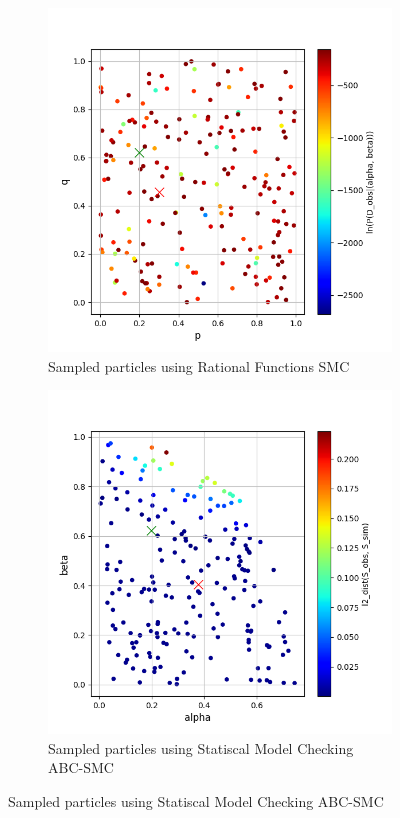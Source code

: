 \begin{figure}[H]
    \centering
    \begin{subfigure}{0.48\textwidth}
        \centering
        \includegraphics[width=\linewidth]{figures/zeroconf10_rf.png}
        \caption{Sampled particles using Rational Functions SMC}
    \end{subfigure}
    \hfill
    \begin{subfigure}{0.48\textwidth}
        \centering
        \includegraphics[width=\linewidth]{figures/zeroconf10_sim.png}
        \caption{Sampled particles using Statiscal Model Checking ABC-SMC}
    \end{subfigure}
\end{figure}

